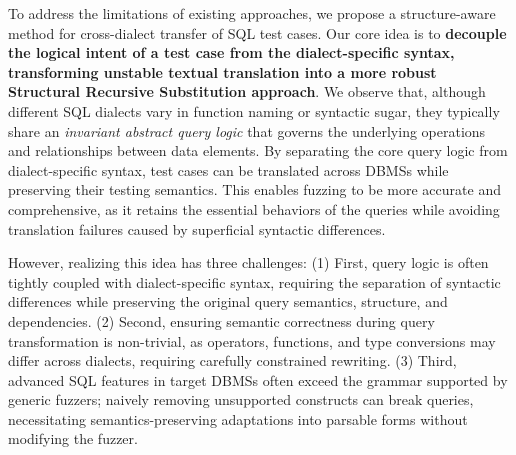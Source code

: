 \documentclass[sigconf,review,anonymous]{acmart}
\begin{document}
To address the limitations of existing approaches, we propose a structure-aware method for cross-dialect transfer of SQL test cases. 
Our core idea is to \textbf{decouple the logical intent of a test case from the dialect-specific syntax, transforming unstable textual translation into a more robust Structural Recursive Substitution approach}.
We observe that, although different SQL dialects vary in function naming or syntactic sugar, they typically share an \textit{invariant abstract query logic} that governs the underlying operations and relationships between data elements.
By separating the core query logic from dialect-specific syntax, test cases can be translated across DBMSs while preserving their testing semantics. 
This enables fuzzing to be more accurate and comprehensive, as it retains the essential behaviors of the queries while avoiding translation failures caused by superficial syntactic differences.

However, realizing this idea has three challenges:
(1) First, query logic is often tightly coupled with dialect-specific syntax, requiring the separation of syntactic differences while preserving the original query semantics, structure, and dependencies.
(2) Second, ensuring semantic correctness during query transformation is non-trivial, as operators, functions, and type conversions may differ across dialects, requiring carefully constrained rewriting.
(3) Third, advanced SQL features in target DBMSs often exceed the grammar supported by generic fuzzers; naively removing unsupported constructs can break queries, necessitating semantics-preserving adaptations into parsable forms without modifying the fuzzer.

\end{document}
